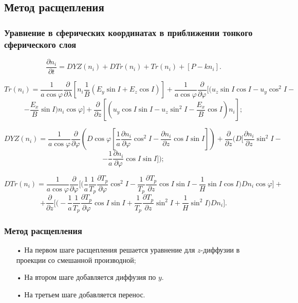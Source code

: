 \documentclass[9pt, apectratio=43,unicode]{beamer}
\begin{document}
\subsection{Метод расщепления}
\begin{frame}\frametitle{Уравнение в сферических координатах в приближении тонкого сферического слоя}

$$\dfrac{\partial n_i}{\partial t} = DYZ(n_i)+DTr(n_i)+Tr(n_i)+[P-kn_i].$$

$$Tr(n_i) = \dfrac{1}{a\cos\varphi}\dfrac{\partial}{\partial\lambda}\left[n_i\dfrac{1}{B}(E_y\sin I + E_z\cos I)\right]+\dfrac{1}{a\cos\varphi}\dfrac{\partial}{\partial\varphi}\bigg[\bigg(u_z\sin I \cos I - u_y\cos^2 I -$$ $$- \dfrac{E_x}{B}\sin I\bigg)n_i\cos\varphi\bigg]+\dfrac{\partial}{\partial z}\left[\left(u_y\cos I \sin I -u_z\sin^2 I - \dfrac{E_x}{B}\cos I\right)n_i\right];$$

$$DYZ(n_i) = \dfrac{1}{a\cos\varphi}\dfrac{\partial}{\partial\varphi}\left(D\cos\varphi\left[\dfrac{1}{a}\dfrac{\partial n_i}{\partial\varphi} \cos^2 I -\dfrac{\partial n_i}{\partial z}\cos I\sin I\right]\right)+ \dfrac{\partial}{\partial z}\bigg(D\bigg[\dfrac{\partial n_i}{\partial z}\sin^2 I -$$ $$- \dfrac{1}{a}\dfrac{\partial n_i}{\partial\varphi}\cos I \sin I\bigg]\bigg);$$ 

$$DTr(n_i) = \dfrac{1}{a\cos\varphi}\dfrac{\partial}{\partial \varphi}\bigg[\bigg(\dfrac{1}{a}\dfrac{1}{T_p}\dfrac{\partial T_p}{\partial\varphi}\cos^2 I-\dfrac{1}{T_p}\dfrac{\partial T_p}{\partial z}\cos I \sin I - \dfrac{1}{H}\sin I \cos I\bigg)Dn_i\cos\varphi\bigg] +$$ $$+ \dfrac{\partial}{\partial z}\bigg[\bigg(-\dfrac{1}{a}\dfrac{1}{T_p}\dfrac{\partial T_p}{\partial \varphi}\cos I \sin I +\dfrac{1}{T_p}\dfrac{\partial T_p}{\partial z}\sin^2 I+\dfrac{1}{H}\sin^2I\bigg)Dn_i\bigg].$$
\end{frame}

\begin{frame}\frametitle{Метод расщепления}
\begin{itemize}
\item[•] На первом шаге расщепления решается уравнение для $z$-диффузии в проекции со смешанной производной;
\item[•] На втором шаге добавляется диффузия по $y$. 
\item[•] На третьем шаге добавляется перенос.
\end{itemize}

\end{frame}
\end{document}

